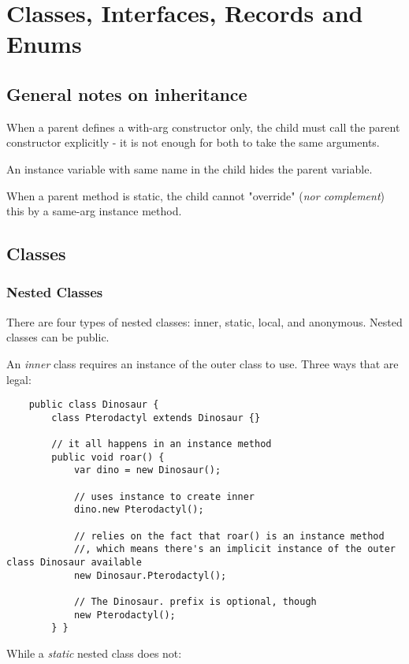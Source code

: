 \documentclass{scrartcl}
\begin{document}
\section{Classes, Interfaces, Records and Enums}
\subsection{General notes on inheritance}

    When a parent defines a with-arg constructor only, the child must call the parent constructor explicitly - it is not enough for both to take the same arguments.

    An instance variable with same name in the child hides the parent variable.

    When a parent method is static, the child cannot "override" (\textit{nor complement}) this by a same-arg instance method.

\subsection{Classes}
\subsubsection{Nested Classes}

    There are four types of nested classes: inner, static, local, and anonymous.
    Nested classes can be public.

    An \textit{inner} class requires an instance of the outer class to use.
    Three ways that are legal:

    \begin{lstlisting}
    public class Dinosaur {
        class Pterodactyl extends Dinosaur {}

        // it all happens in an instance method
        public void roar() {
            var dino = new Dinosaur();

            // uses instance to create inner
            dino.new Pterodactyl();

            // relies on the fact that roar() is an instance method
            //, which means there's an implicit instance of the outer class Dinosaur available
            new Dinosaur.Pterodactyl();

            // The Dinosaur. prefix is optional, though
            new Pterodactyl();
        } }
    \end{lstlisting}

    While a \textit{static} nested class does not:
\end{document}
